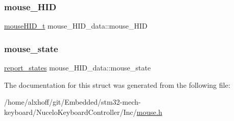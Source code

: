\subsubsection{\texorpdfstring{mouse\+\_\+\+H\+ID}{mouse\_HID}}
{\footnotesize\ttfamily \hyperlink{mouse_8h_aee70866b560d9530d3c2ccc19c21b346}{mouse\+H\+I\+D\+\_\+t} mouse\+\_\+\+H\+I\+D\+\_\+data\+::mouse\+\_\+\+H\+ID}

\mbox{\label{structmouse__HID__data_a26b736ac3bf561f7751d5201a47e913e}} 
\subsubsection{\texorpdfstring{mouse\+\_\+state}{mouse\_state}}
{\footnotesize\ttfamily \hyperlink{states_8h_a97ae098857b45ee4ac9f7ae3a41a7aff}{report\+\_\+states} mouse\+\_\+\+H\+I\+D\+\_\+data\+::mouse\+\_\+state}



The documentation for this struct was generated from the following file\+:\begin{DoxyCompactItemize}
\item 
/home/alxhoff/git/\+Embedded/stm32-\/mech-\/keyboard/\+Nucelo\+Keyboard\+Controller/\+Inc/\hyperlink{mouse_8h}{mouse.\+h}\end{DoxyCompactItemize}
